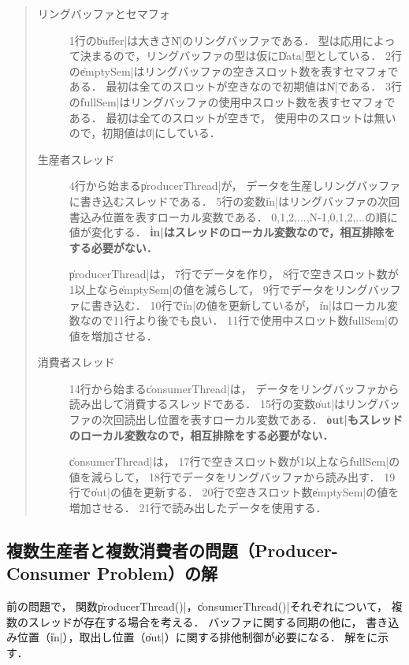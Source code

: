 \begin{quote}
\begin{description}
\item [リングバッファとセマフォ]
1行の\|buffer|は大きさ\|N|のリングバッファである．
型は応用によって決まるので，リングバッファの型は仮に\|Data|型としている．
2行の\|emptySem|はリングバッファの空きスロット数を表すセマフォである．
最初は全てのスロットが空きなので初期値は\|N|である．
3行の\|fullSem|はリングバッファの使用中スロット数を表すセマフォである．
最初は全てのスロットが空きで，
使用中のスロットは無いので，初期値は\|0|にしている．

\item [生産者スレッド]
4行から始まる\|producerThread|が，
データを生産しリングバッファに書き込むスレッドである．
5行の変数\|in|はリングバッファの次回書込み位置を表すローカル変数である．
0,1,2,...,N-1,0,1,2,...の順に値が変化する．
{\bf \|in|はスレッドのローカル変数なので，相互排除をする必要がない．}

\|producerThread|は，
7行でデータを作り，
8行で空きスロット数が1以上なら\|emptySem|の値を減らして，
9行でデータをリングバッファに書き込む．
10行で\|in|の値を更新しているが，
\|in|はローカル変数なので11行より後でも良い．
11行で使用中スロット数\|fullSem|の値を増加させる．

\item [消費者スレッド]
14行から始まる\|consumerThread|は，
データをリングバッファから読み出して消費するスレッドである．
15行の変数\|out|はリングバッファの次回読出し位置を表すローカル変数である．
{\bf \|out|もスレッドのローカル変数なので，相互排除をする必要がない．}

\|consumerThread|は，
17行で空きスロット数が1以上なら\|fullSem|の値を減らして，
18行でデータをリングバッファから読み出す．
19行で\|out|の値を更新する．
20行で空きスロット数\|emptySem|の値を増加させる．
21行で読み出したデータを使用する．
\end{description}
\end{quote}

\subsection{複数生産者と複数消費者の問題（Producer-Consumer Problem）の解}
前の問題で，
関数\|producerThread()|，\|consumerThread()|それぞれについて，
複数のスレッドが存在する場合を考える．
バッファに関する同期の他に，
書き込み位置（\|in|），取出し位置（\|out|）に関する排他制御が必要になる．
解をに示す．

